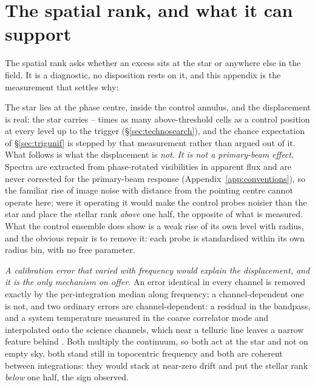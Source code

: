 \section{The spatial rank, and what it can support}
\label{app:radius}

The spatial rank asks whether an excess sits at the star or anywhere else in
the field. It is a diagnostic, no disposition rests on it, and this appendix
is the measurement that settles why: \rankstatus{}

The star lies at the phase centre, inside the control annulus, and the
displacement is real: the star carries \CkRatioLo--\CkRatioHi{} times as many
above-threshold cells as a control position at every level up to the trigger
(\S\ref{sec:technosearch}), and the chance expectation of
\S\ref{sec:trigunif} is stepped by that measurement rather than argued out of
it. What follows is what the displacement is \emph{not}.
\emph{It is not a primary-beam effect.} Spectra are
extracted from phase-rotated visibilities in apparent flux and are never
corrected for the primary-beam response (Appendix~\ref{app:conventions}), so
the familiar rise of image noise with distance from the pointing centre
cannot operate here; were it operating it would make the control probes
noisier than the star and place the stellar rank \emph{above} one half, the
opposite of what is measured. What the control ensemble does show is a weak
rise of its own level with radius, and the obvious repair is to remove it:
each probe is standardised within its own radius bin, with no free parameter.

\emph{A calibration error that varied with frequency would explain the
displacement, and it is the only mechanism on offer.} An error identical in
every channel is removed exactly by the per-integration median along
frequency; a channel-dependent one is not, and two ordinary errors are
channel-dependent: a residual in the bandpass, and a system temperature
measured in the coarse correlator mode and interpolated onto the science
channels, which near a telluric line leaves a narrow feature behind
\citep{ALMATsys2018}. Both
multiply the continuum, so both act at the star and not on empty sky, both
stand still in topocentric frequency and both are coherent between
integrations: they would stack at near-zero drift and put the stellar rank
\emph{below} one half, the sign observed.


